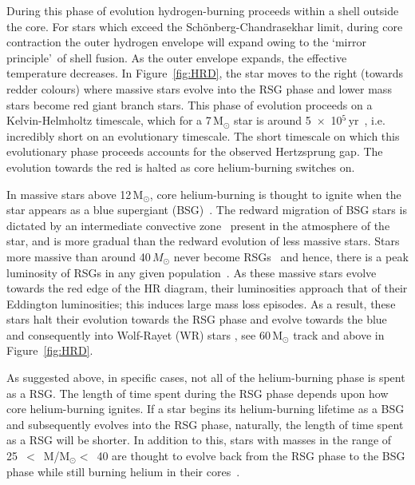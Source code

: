 {During this phase of evolution hydrogen-burning proceeds within a shell outside the core.
For stars which exceed the Sch\"onberg-Chandrasekhar limit, during core contraction the outer hydrogen envelope will expand owing to the \textquoteleft mirror principle\textquoteright ~of shell fusion.\footnotemark
{}
As the outer envelope expands, the effective temperature decreases.
In Figure~\ref{fig:HRD}, the star moves to the right (towards redder colours) where massive stars evolve into the RSG phase and lower mass stars become red giant branch stars.
This phase of evolution proceeds on a Kelvin-Helmholtz timescale, which for a 7\,M$_{\odot}$ star is around 5~$\times$~10$^{5}$\,yr~\citep{2012sse..book.....K}, i.e. incredibly short on an evolutionary timescale.
The short timescale on which this evolutionary phase proceeds accounts for the observed Hertzsprung gap.
The evolution towards the red is halted as core helium-burning switches on.

In massive stars above 12\,M$_{\odot}$, core helium-burning is thought to ignite when the star appears as a blue supergiant (BSG)~\citep{Meynet11,2012A&A...537A.146E,Langer12,Saio13}.
The redward migration of BSG stars is dictated by an intermediate convective zone~\citep{Meynet11} present in the atmosphere of the star, and is more gradual than the redward evolution of less massive stars.
Stars more massive than around 40\,$M_{\odot}$ never become RSGs~\citep{Massey03,Meynet11,2012A&A...537A.146E} and hence, there is a peak luminosity of RSGs in any given population~\citep{1979ApJ...232..409H}.
As these massive stars evolve towards the red edge of the HR diagram, their luminosities approach that of their Eddington luminosities; this induces large mass loss episodes.
As a result, these stars halt their evolution towards the RSG phase and evolve towards the blue and consequently into Wolf-Rayet (WR) stars
\citep{2007ARA&A..45..177C, Vink09}, see 60\,M$_{\odot}$ track and above in Figure~\ref{fig:HRD}.

As suggested above, in specific cases, not all of the helium-burning phase is spent as a RSG.
The length of time spent during the RSG phase depends upon how core helium-burning ignites.
If a star begins its helium-burning lifetime as a BSG and subsequently evolves into the RSG phase, naturally, the length of time spent as a RSG will be shorter.
In addition to this, stars with masses in the range of 25~$<$~M/M$_{\odot}<$~40 are thought to evolve back from the RSG phase to the BSG phase while still burning helium in their cores~\citep{2012A&A...537A.146E}.

}
